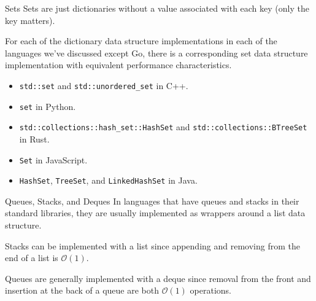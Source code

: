 \documentclass{algo}
\begin{document}
\begin{frame}{Sets}
    Sets are just dictionaries without a value associated with each key (only
    the key matters).

    For each of the dictionary data structure implementations in each of the
    languages we've discussed except Go, there is a corresponding set data
    structure implementation with equivalent performance characteristics.
    \pause

    \begin{itemize}
        \item \texttt{std::set} and \texttt{std::unordered\_set} in C++.
        \item \texttt{set} in Python.
        \item \texttt{std::collections::hash\_set::HashSet} and
            \texttt{std::collections::BTreeSet} in Rust.
        \item \texttt{Set} in JavaScript.
        \item \texttt{HashSet}, \texttt{TreeSet}, and \texttt{LinkedHashSet} in
            Java.
    \end{itemize}
\end{frame}

\begin{frame}{Queues, Stacks, and Deques}
    In languages that have queues and stacks in their standard libraries, they
    are usually implemented as wrappers around a list data structure.
    \pause

    Stacks can be implemented with a list since appending and removing from the
    end of a list is $\mathcal{O}(1)$.
    \pause

    Queues are generally implemented with a deque since removal from the front
    and insertion at the back of a queue are both $\mathcal{O}(1)$ operations.
\end{frame}
\end{document}
